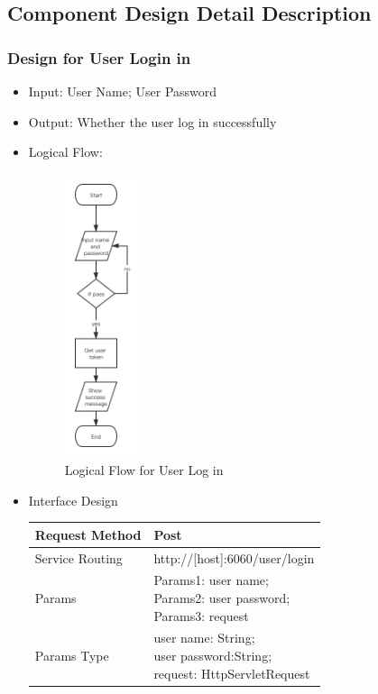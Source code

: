 \documentclass[16pt]{scrreprt}
\begin{document}
\subsection{Component Design Detail Description}
\subsubsection{Design for User Login in}
\begin{itemize}
	\item Input: User Name; User Password
	\item Output: Whether the user log in successfully
	\item Logical Flow:
	 \begin{figure}[H]
	\centering
	\includegraphics[width=0.2\textwidth]{diagrams/login.png}
	\caption{Logical Flow for User Log in}
\end{figure}
	\item Interface Design
	\begin{center}
    \begin{tabular}{p{5cm}p{10cm}}
        \hline
	    Request Method & Post\\
        \hline
	    Service Routing &  http://[host]:6060/user/login\\
        \hline
	    Params & \makecell[l]{Params1: user name;\\ Params2: user password;\\ Params3: request}\\ 
        \hline
        Params Type & \makecell[l]{user name: String;\\user password:String;\\ request: HttpServletRequest}\\

\end{tabular}
\end{center}
\end{itemize}
\end{document}
